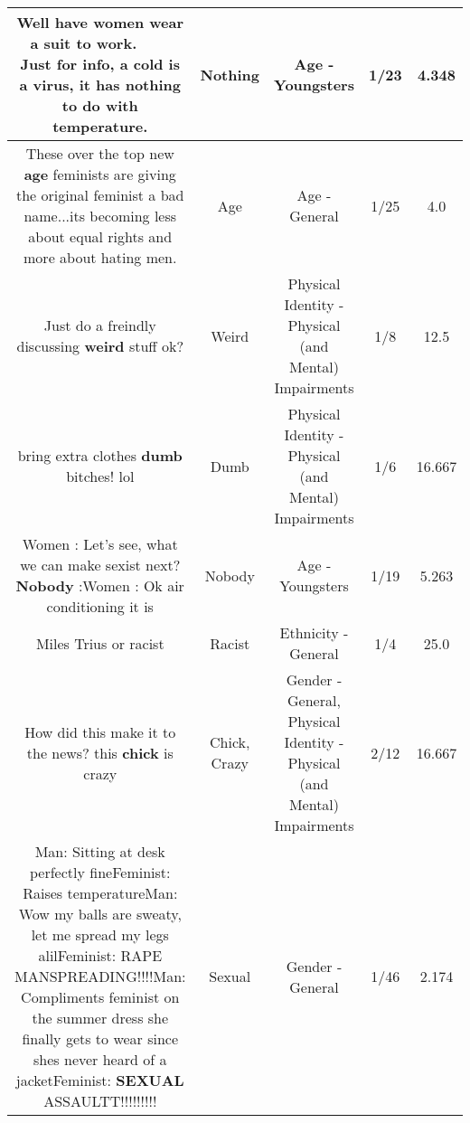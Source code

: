 \documentclass[11pt]{article}
\newlength\mylength
\begin{document}
\begin{center}
\begin{longtable}{|C{.65\mylength}|C{.30\mylength}|C{.12\mylength}|C{.12\mylength}|C{.12\mylength}|}
  \small Well have women wear a suit to work.     Just for info, a cold is a virus, it has \textbf{nothing} to do with temperature.\normalsize   & Nothing & Age - Youngsters & 1/23 & 4.348 \\  \hline
  \small These over the top new \textbf{age} feminists are giving the original feminist a bad name...its becoming less about equal rights and more about hating men.\normalsize   & Age & Age - General & 1/25 & 4.0 \\  \hline
  \small Just do a freindly discussing \textbf{weird} stuff ok?\normalsize   & Weird & Physical Identity - Physical (and Mental) Impairments & 1/8 & 12.5 \\  \hline
  \small bring extra clothes \textbf{dumb} bitches! lol\normalsize   & Dumb & Physical Identity - Physical (and Mental) Impairments & 1/6 & 16.667 \\  \hline
  \small Women : Let's see, what we can make sexist next?\textbf{Nobody} :Women : Ok air conditioning it is\normalsize   & Nobody & Age - Youngsters & 1/19 & 5.263 \\  \hline
  \small Miles Trius or racist\normalsize   & Racist & Ethnicity - General & 1/4 & 25.0 \\  \hline
  \small How did this make it to the news? this \textbf{chick} is crazy\normalsize   & Chick, Crazy & Gender - General, Physical Identity - Physical (and Mental) Impairments & 2/12 & 16.667 \\  \hline
  \small Man: Sitting at desk perfectly fineFeminist: Raises temperatureMan: Wow my balls are sweaty, let me spread my legs alilFeminist: RAPE MANSPREADING!!!!Man: Compliments feminist on the summer dress she finally gets to wear since shes never heard of a jacketFeminist: \textbf{SEXUAL} ASSAULTT!!!!!!!!!\normalsize   & Sexual & Gender - General & 1/46 & 2.174 \\  \hline

\end{longtable}
\end{center}
\end{document}
